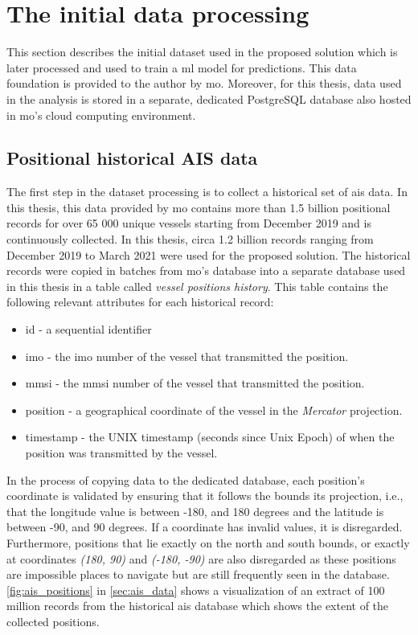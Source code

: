 \section{The initial data processing}

This section describes the initial dataset used in the proposed solution which is later processed and used to train a \acrshort{ml} model for predictions. This data foundation is provided to the author by \acrfull{mo}. Moreover, for this thesis, data used in the analysis is stored in a separate, dedicated PostgreSQL database also hosted in \acrshort{mo}'s cloud computing environment.

\subsection{Positional historical AIS data}

The first step in the dataset processing is to collect a historical set of \acrshort{ais} data. In this thesis, this data provided by \acrshort{mo} contains more than 1.5 billion positional records for over 65 000 unique vessels starting from December 2019 and is continuously collected. In this thesis, circa 1.2 billion records ranging from December 2019 to March 2021 were used for the proposed solution. The historical records were copied in batches from \acrshort{mo}'s database into a separate database used in this thesis in a table called \textit{vessel positions history}. This table contains the following relevant attributes for each historical record:

\begin{itemize}
    \item id - a sequential identifier
    \item imo - the \acrshort{imo} number of the vessel that transmitted the position.
    \item mmsi - the \acrshort{mmsi} number of the vessel that transmitted the position.
    \item position - a geographical coordinate of the vessel in the \textit{Mercator} projection.
    \item timestamp - the UNIX timestamp (seconds since Unix Epoch) of when the position was transmitted by the vessel.
\end{itemize}

In the process of copying data to the dedicated database, each position's coordinate is validated by ensuring that it follows the bounds its projection, i.e., that the longitude value is between -180, and 180 degrees and the latitude is between -90, and 90 degrees. If a coordinate has invalid values, it is disregarded. Furthermore, positions that lie exactly on the north and south bounds, or exactly at coordinates \textit{(180, 90)} and \textit{(-180, -90)} are also disregarded as these positions are impossible places to navigate but are still frequently seen in the database. \cref{fig:ais_positions} in \cref{sec:ais_data} shows a visualization of an extract of 100 million records from the historical \acrshort{ais} database which shows the extent of the collected positions.

